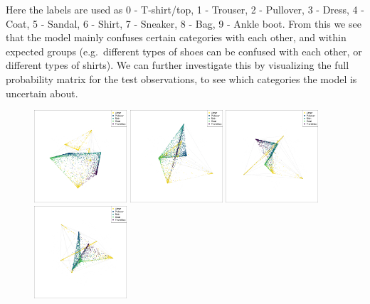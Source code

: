 \documentclass[
  letterpaper,
]{krantz}
\begin{document}
Here the labels are used as 0 - T-shirt/top, 1 - Trouser, 2 - Pullover,
3 - Dress, 4 - Coat, 5 - Sandal, 6 - Shirt, 7 - Sneaker, 8 - Bag, 9 -
Ankle boot. From this we see that the model mainly confuses certain
categories with each other, and within expected groups (e.g.~different
types of shoes can be confused with each other, or different types of
shirts). We can further investigate this by visualizing the full
probability matrix for the test observations, to see which categories
the model is uncertain about.

\begin{figure}

\begin{minipage}{0.33\linewidth}
\includegraphics[width=1.35417in,height=\textheight]{images/fashion_confustion_gt_36.png}\end{minipage}%
%
\begin{minipage}{0.33\linewidth}
\includegraphics[width=1.35417in,height=\textheight]{images/fashion_confusion_gt_58.png}\end{minipage}%
%
\begin{minipage}{0.33\linewidth}
\includegraphics[width=1.35417in,height=\textheight]{images/fashion_confusion_gt_69.png}\end{minipage}%
\newline
\begin{minipage}{0.33\linewidth}
\includegraphics[width=1.35417in,height=\textheight]{images/fashion_confusion_gt_161.png}\end{minipage}%

\end{figure}
\end{document}
